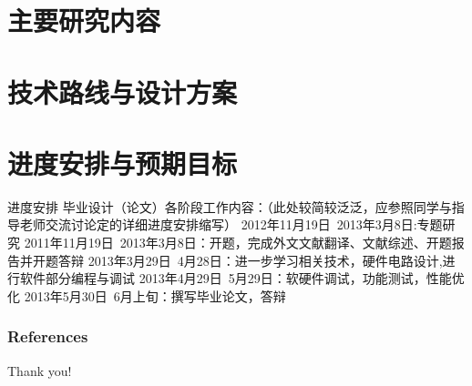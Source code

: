 \documentclass[notes]{beamer}
\newcommand{\chuhao}{\fontsize{44.9pt}{\baselineskip}\selectfont}
\begin{document}
\section{主要研究内容}

\section{技术路线与设计方案}

\section{进度安排与预期目标}
\begin{frame}
	{进度安排}
	毕业设计（论文）各阶段工作内容：（此处较简较泛泛，应参照同学与指导老师交流讨论定的详细进度安排缩写）
	2012年11月19日~2013年3月8日:专题研究
	2011年11月19日~2013年3月8日：开题，完成外文文献翻译、文献综述、开题报告并开题答辩
	2013年3月29日~4月28日：进一步学习相关技术，硬件电路设计,进行软件部分编程与调试
	2013年4月29日~5月29日：软硬件调试，功能测试，性能优化
	2013年5月30日~6月上旬：撰写毕业论文，答辩 \cite{markowitz1952portfolio}

\end{frame}





\begin{frame}[t, allowframebreaks]
\frametitle{References}


\printbibliography
\end{frame}

\begin{frame}
	\chuhao Thank you! %
\end{frame}
\end{document}
